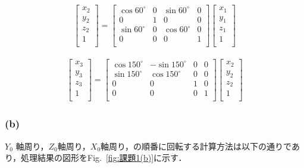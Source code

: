 \documentclass[a4paper,10pt]{jsarticle}
\begin{document}
\begin{eqnarray}
\label{eq:b}
  \left[
    \begin{array}{c}
      x_2\\
      y_2\\
      z_2\\
      1\\
    \end{array}
  \right] =
  \left[
    \begin{array}{cccc}
      \cos{60^\circ} & 0 & \sin{60^\circ} & 0 \\
      0 & 1 & 0 & 0\\
      \sin{60^\circ} & 0 & \cos{60^\circ} & 0\\
      0 & 0 & 0 & 1\\
    \end{array}
  \right]\left[
    \begin{array}{c}
      x_1\\
      y_1\\
      z_1\\
      1\\
    \end{array}
  \right]
\end{eqnarray}

\begin{eqnarray}
\label{eq:c}
  \left[
    \begin{array}{c}
      x_3\\
      y_3\\
      z_3\\
      1\\
    \end{array}
  \right] =
  \left[
    \begin{array}{cccc}
      \cos{150^\circ} & -\sin{150^\circ} & 0 & 0 \\
      \sin{150^\circ} & \cos{150^\circ} & 0 & 0\\
      0 & 0 & 1 & 0\\
      0 & 0 & 0 & 1\\
    \end{array}
  \right]\left[
    \begin{array}{c}
      x_2\\
      y_2\\
      z_2\\
      1\\
    \end{array}
  \right]
\end{eqnarray}

\subsubsection{(b)}
$Y_0$ 軸周り，$Z_0$軸周り，$X_0$軸周り，の順番に回転する計算方法は以下の通りであり，処理結果の図形をFig.~\ref{fig:課題1(b)}に示す．
\end{document}
